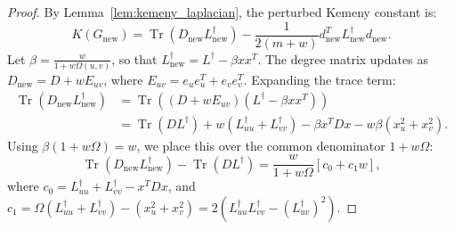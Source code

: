 \documentclass[11pt,a4paper]{article}
\theoremstyle{plain}
\theoremstyle{definition}
\begin{document}
\begin{proof}
By Lemma~\ref{lem:kemeny_laplacian}, the perturbed Kemeny constant is:
\begin{equation}
    K(G_{\mathrm{new}}) = \operatorname{Tr}(D_{\mathrm{new}} L_{\mathrm{new}}^\dagger) - \frac{1}{2(m + w)} d_{\mathrm{new}}^T L_{\mathrm{new}}^\dagger d_{\mathrm{new}}.
\end{equation}
Let $\beta = \frac{w}{1 + w \Omega(u, v)}$, so that $L_{\mathrm{new}}^\dagger = L^\dagger - \beta x x^T$. The degree matrix updates as $D_{\mathrm{new}} = D + w E_{uv}$, where $E_{uv} = e_u e_u^T + e_v e_v^T$. Expanding the trace term:
\begin{align}
    \operatorname{Tr}(D_{\mathrm{new}} L_{\mathrm{new}}^\dagger) &= \operatorname{Tr}\left( (D + w E_{uv})(L^\dagger - \beta x x^T) \right) \nonumber \\
    &= \operatorname{Tr}(D L^\dagger) + w (L^\dagger_{uu} + L^\dagger_{vv}) - \beta x^T D x - w \beta (x_u^2 + x_v^2).
\end{align}
Using $\beta(1 + w \Omega) = w$, we place this over the common denominator $1 + w \Omega$:
\begin{equation}
    \operatorname{Tr}(D_{\mathrm{new}} L_{\mathrm{new}}^\dagger) - \operatorname{Tr}(D L^\dagger) = \frac{w}{1 + w \Omega} \left[ c_0 + c_1 w \right],
\end{equation}
where $c_0 = L^\dagger_{uu} + L^\dagger_{vv} - x^T D x$, and $c_1 = \Omega(L^\dagger_{uu} + L^\dagger_{vv}) - (x_u^2 + x_v^2) = 2(L^\dagger_{uu} L^\dagger_{vv} - (L^\dagger_{uv})^2)$.


\end{proof}
\end{document}
